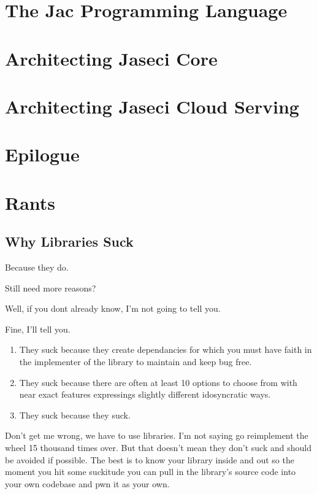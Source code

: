 \documentclass{book}
\begin{document}
\chapter{The Jac Programming Language}


\chapter{Architecting Jaseci Core}


\chapter{Architecting Jaseci Cloud Serving}

\chapter*{Epilogue}

\appendix
\chapter{Rants}
\section{Why Libraries Suck}
\label{rant:librariessuck}
\par
Because they do.
\par
Still need more reasons?
\par
Well, if you dont already know, I'm not going to tell you.
\par
Fine, I'll tell you.
\begin{enumerate}
    \item They suck because they create dependancies for which you must have faith in the implementer of the library to maintain and keep bug free.
    \item They suck because there are often at least 10 options to choose from with near exact features expressings slightly different idosyncratic ways.
    \item They suck because they suck.
\end{enumerate}
Don't get me wrong, we have to use libraries. I'm not saying go reimplement the wheel 15 thousand times over. But that doesn't mean they don't suck and should be avoided if possible. The best is to know your library inside and out so the moment you hit some suckitude you can pull in the library's source code into your own codebase and \gls{pwn} it as your own.





\end{document}
